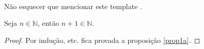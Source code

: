 \exercicio

\paragraph{} Não esquecer que mencionar este template
\cite[Algo]{uabefoliotemplate}.

\alinea

\begin{prop}\label{prop1a}
	Seja $n \in \mathbb{N}$, então $n + 1 \in \mathbb{N}$.
\end{prop}

\begin{proof}
	Por indução, etc. fica provada a proposição \ref{prop1a}.
\end{proof}

